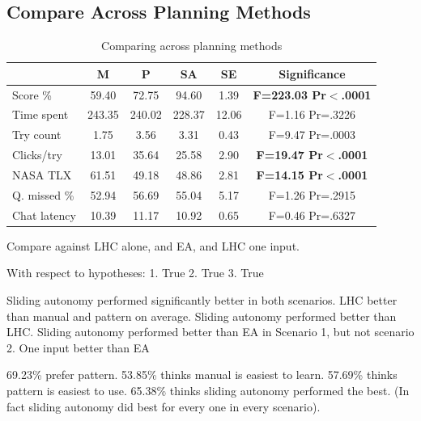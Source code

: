 \documentclass[journal]{IEEEtran}
\begin{document}
\subsection{Compare Across Planning Methods}




\begin{table}
\caption{Comparing across planning methods}
\scriptsize
	\centering
		\begin{tabular}
			{|l|c|c|c|c|c|}
			\hline
			& M & P & SA & SE & Significance \\
			\hline
			Score \% & 59.40 & 72.75 & 94.60 & 1.39 & \textbf{F=223.03 Pr$<$.0001} \\
			Time spent & 243.35 & 240.02 & 228.37 & 12.06 & F=1.16 Pr=.3226 \\
			Try count & 1.75 & 3.56 & 3.31 & 0.43 & F=9.47 Pr=.0003 \\
			Clicks/try & 13.01 & 35.64 & 25.58 & 2.90 & \textbf{F=19.47 Pr$<$.0001} \\
			NASA TLX & 61.51 & 49.18 & 48.86 & 2.81 & \textbf{F=14.15 Pr$<$.0001} \\
			\hline
			Q. missed \% & 52.94 & 56.69 & 55.04 & 5.17 & F=1.26 Pr=.2915 \\
			Chat latency & 10.39 & 11.17 & 10.92 & 0.65 & F=0.46 Pr=.6327 \\
			\hline			
		\end{tabular}
\label{AcrossMethods}
\end{table}







Compare against LHC alone, and EA, and LHC one input.



With respect to hypotheses:
1. True
2. True
3. True

Sliding autonomy performed significantly better in both scenarios.
LHC better than manual and pattern on average.
Sliding autonomy performed better than LHC.
Sliding autonomy performed better than EA in Scenario 1, but not scenario 2.
One input better than EA




69.23\% prefer pattern.
53.85\% thinks manual is easiest to learn. 
57.69\% thinks pattern is easiest to use.
65.38\% thinks sliding autonomy performed the best. (In fact sliding autonomy did best for every one in every scenario).
\end{document}
